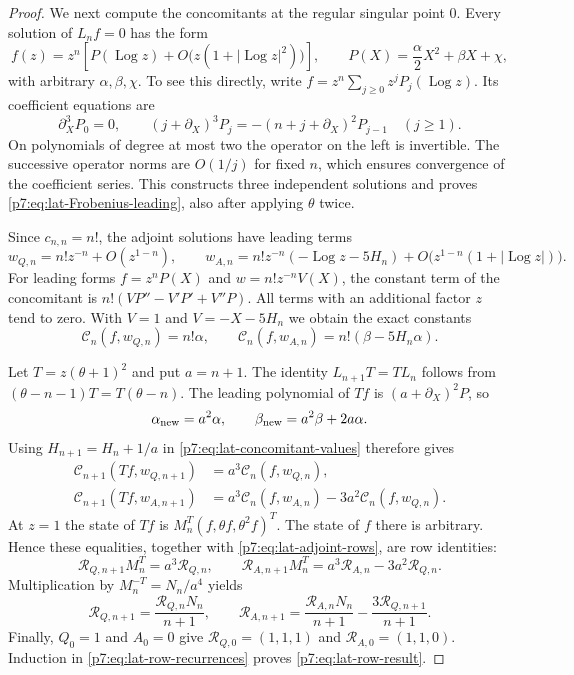 \documentclass[11pt,a4paper]{article}
\theoremstyle{definition}
\theoremstyle{remark}
\DeclareMathOperator{\Log}{Log}
\numberwithin{equation}{section}
\begin{document}
\begin{proof}
We next compute the concomitants at the regular singular point $0$.
Every solution of $L_nf=0$ has the form
\begin{equation}\label{p7:eq:lat-Frobenius-leading}
f(z)=z^n\left[P(\Log z)+O\bigl(z(1+|\Log z|^2)\bigr)\right],
\qquad P(X)=\frac{\alpha}{2}X^2+\beta X+\chi,
\end{equation}
with arbitrary $\alpha,\beta,\chi$.  To see this directly, write
$f=z^n\sum_{j\geq0}z^jP_j(\Log z)$.  Its coefficient equations are
\[
\partial_X^3P_0=0,\qquad
(j+\partial_X)^3P_j=-(n+j+\partial_X)^2P_{j-1}\quad(j\geq1).
\]
On polynomials of degree at most two the operator on the left is
invertible.  The successive operator norms are $O(1/j)$ for fixed $n$,
which ensures convergence of the coefficient series.  This constructs
three independent solutions and proves \eqref{p7:eq:lat-Frobenius-leading},
also after applying $\theta$ twice.

Since $c_{n,n}=n!$, the adjoint solutions have leading terms
\[
w_{Q,n}=n!z^{-n}+O(z^{1-n}),\qquad
w_{A,n}=n!z^{-n}(-\Log z-5H_n)
 +O\bigl(z^{1-n}(1+|\Log z|)\bigr).
\]
For leading forms $f=z^nP(X)$ and $w=n!z^{-n}V(X)$, the constant
term of the concomitant is
$n!(VP''-V'P'+V''P)$.  All terms with an additional factor $z$ tend
to zero.  With $V=1$ and $V=-X-5H_n$ we obtain the exact constants
\begin{equation}\label{p7:eq:lat-concomitant-values}
\mathcal C_n(f,w_{Q,n})=n!\alpha,\qquad
\mathcal C_n(f,w_{A,n})=n!(\beta-5H_n\alpha).
\end{equation}

Let $T=z(\theta+1)^2$ and put $a=n+1$.  The identity
$L_{n+1}T=TL_n$ follows from $(\theta-n-1)T=T(\theta-n)$.
The leading polynomial of $Tf$ is $(a+\partial_X)^2P$, so
\[
\alpha_{\rm new}=a^2\alpha,\qquad
\beta_{\rm new}=a^2\beta+2a\alpha.
\]
Using $H_{n+1}=H_n+1/a$ in
\eqref{p7:eq:lat-concomitant-values} therefore gives
\begin{align*}
\mathcal C_{n+1}(Tf,w_{Q,n+1})
 &=a^3\mathcal C_n(f,w_{Q,n}),\\
\mathcal C_{n+1}(Tf,w_{A,n+1})
 &=a^3\mathcal C_n(f,w_{A,n})
   -3a^2\mathcal C_n(f,w_{Q,n}).
\end{align*}
At $z=1$ the state of $Tf$ is $M_n^T(f,\theta f,\theta^2f)^T$.
The state of $f$ there is arbitrary.  Hence these equalities, together
with \eqref{p7:eq:lat-adjoint-rows}, are row identities:
\[
\mathcal R_{Q,n+1}M_n^T=a^3\mathcal R_{Q,n},\qquad
\mathcal R_{A,n+1}M_n^T
 =a^3\mathcal R_{A,n}-3a^2\mathcal R_{Q,n}.
\]
Multiplication by $M_n^{-T}=N_n/a^4$ yields
\begin{equation}\label{p7:eq:lat-row-recurrences}
\mathcal R_{Q,n+1}=\frac{\mathcal R_{Q,n}N_n}{n+1},\qquad
\mathcal R_{A,n+1}
 =\frac{\mathcal R_{A,n}N_n}{n+1}
  -\frac{3\mathcal R_{Q,n+1}}{n+1}.
\end{equation}
Finally, $Q_0=1$ and $A_0=0$ give
$\mathcal R_{Q,0}=(1,1,1)$ and
$\mathcal R_{A,0}=(1,1,0)$.  Induction in
\eqref{p7:eq:lat-row-recurrences} proves \eqref{p7:eq:lat-row-result}.
\end{proof}
\end{document}
